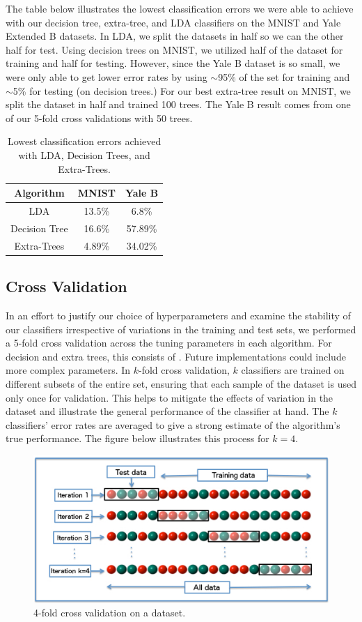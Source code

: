 \label{sec:bestresults}
The table below illustrates the lowest classification errors we were able to achieve with our decision tree, extra-tree, and LDA classifiers on the MNIST and Yale Extended B datasets. In LDA, we split the datasets in half so we can the other half for test. Using decision trees on MNIST, we utilized half of the dataset for training and half for testing. However, since the Yale B dataset is so small, we were only able to get lower error rates by using $\sim$95\% of the set for training and $\sim$5\% for testing (on decision trees.) For our best extra-tree result on MNIST, we split the dataset in half and trained 100 trees. The Yale B result comes from one of our 5-fold cross validations with 50 trees.

\begin{table}[H]
  \centering
  \begin{tabular}{||c | c | c||} 
    \hline
    Algorithm & MNIST & Yale B \\
    \hline\hline
    LDA & 13.5\%  & 6.8\% \\ 
    \hline
    Decision Tree & 16.6\% & 57.89\% \\ 
    \hline
    Extra-Trees & 4.89\% & 34.02\% \\
    \hline
  \end{tabular}
  \caption{Lowest classification errors achieved with LDA, Decision Trees, and Extra-Trees.}
\end{table}

\subsection{Cross Validation}

In an effort to justify our choice of hyperparameters and examine the stability of our classifiers irrespective of variations in the training and test sets, we performed a 5-fold cross validation across the tuning parameters in each algorithm. For decision and extra trees, this consists of . Future implementations could include more complex parameters. In $k$-fold cross validation, $k$ classifiers are trained on different subsets of the entire set, ensuring that each sample of the dataset is used only once for validation. This helps to mitigate the effects of variation in the dataset and illustrate the general performance of the classifier at hand. The $k$ classifiers' error rates are averaged to give a strong estimate of the algorithm's true performance. The figure below illustrates this process for $k=4$.  
%
\begin{figure}[H]
  \centering\includegraphics[width=0.6\columnwidth]{../images/K-fold_cross_validation_EN}
  \caption{4-fold cross validation on a dataset.}
\end{figure}
 
